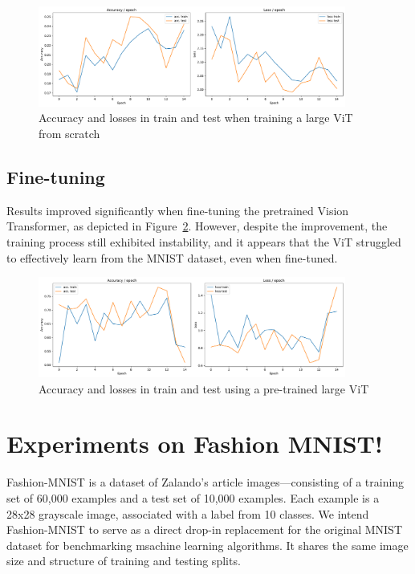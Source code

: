 \begin{figure}[H]
    \centering
    \includegraphics*[width=0.9\textwidth]{figs/Transformers/stats_vit_15.pdf}
    \caption{Accuracy and losses in train and test when training a large ViT from scratch}
    \label{fig:stats_vit}
\end{figure}


\subsection{Fine-tuning}
Results improved significantly when fine-tuning the pretrained Vision Transformer, as depicted in Figure~\ref{fig:stats_vit_pretrained}. However, despite the improvement, the training process still exhibited instability, and it appears that the ViT struggled to effectively learn from the MNIST dataset, even when fine-tuned.
\begin{figure}[H]
    \centering
    \includegraphics*[width=0.9\textwidth]{figs/Transformers/stats_vit_pretrained_15.pdf}
    \caption{Accuracy and losses in train and test using a pre-trained large ViT}
    \label{fig:stats_vit_pretrained}
\end{figure}

\section{Experiments on Fashion MNIST!}
Fashion-MNIST is a dataset of Zalando's article images—consisting of a training set of 60,000 examples and a test set of 10,000 examples. Each example is a 28x28 grayscale image, associated with a label from 10 classes. We intend Fashion-MNIST to serve as a direct drop-in replacement for the original MNIST dataset for benchmarking msachine learning algorithms. It shares the same image size and structure of training and testing splits.

